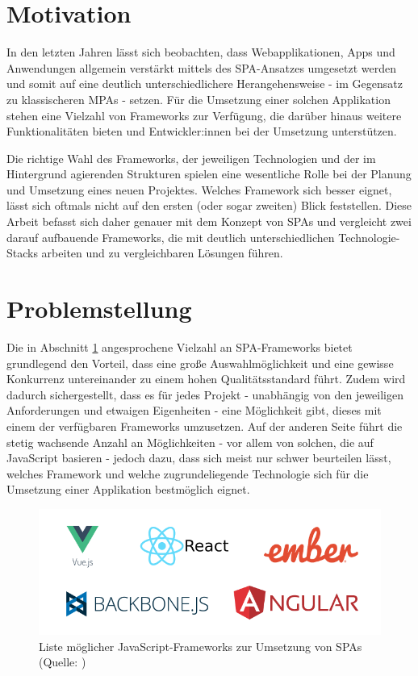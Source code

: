 \documentclass[a4paper,12pt,twoside]{scrreprt}
\begin{document}
\section{Motivation}
\label{sec:motivation}
In den letzten Jahren lässt sich beobachten, dass Webapplikationen, Apps und Anwendungen allgemein verstärkt mittels des \ac{SPA}-Ansatzes umgesetzt werden und somit auf eine deutlich unterschiedlichere Herangehensweise - im Gegensatz zu klassischeren \acp{MPA} - setzen. \parencite[][]{ismail_why_2019} Für die Umsetzung einer solchen Applikation stehen eine Vielzahl von Frameworks zur Verfügung, die darüber hinaus weitere Funktionalitäten bieten und Entwickler:innen bei der Umsetzung unterstützen.

\newpage

Die richtige Wahl des Frameworks, der jeweiligen Technologien und der im Hintergrund agierenden Strukturen spielen eine wesentliche Rolle bei der Planung und Umsetzung eines neuen Projektes. Welches Framework sich besser eignet, lässt sich oftmals nicht auf den ersten (oder sogar zweiten) Blick feststellen. Diese Arbeit befasst sich daher genauer mit dem Konzept von \acp{SPA} und vergleicht zwei darauf aufbauende Frameworks, die mit deutlich unterschiedlichen Technologie-Stacks arbeiten und zu vergleichbaren Lösungen führen.

\section{Problemstellung}
\label{sec:problemstellung}
Die in Abschnitt \ref{sec:motivation} angesprochene Vielzahl an \ac{SPA}-Frameworks bietet grundlegend den Vorteil, dass eine große Auswahlmöglichkeit und eine gewisse Konkurrenz untereinander zu einem hohen Qualitätsstandard führt. Zudem wird dadurch sichergestellt, dass es für jedes Projekt - unabhängig von den jeweiligen Anforderungen und etwaigen Eigenheiten - eine Möglichkeit gibt, dieses mit einem der verfügbaren Frameworks umzusetzen. Auf der anderen Seite führt die stetig wachsende Anzahl an Möglichkeiten - vor allem von solchen, die auf JavaScript basieren - jedoch dazu, dass sich meist nur schwer beurteilen lässt, welches Framework und welche zugrundeliegende Technologie sich für die Umsetzung einer Applikation bestmöglich eignet.

\begin{figure}[ht]
    \centering
    \includegraphics[scale=0.5]{images/A_JS-frameworks.png}
    \caption[Liste möglicher JavaScript-Frameworks zur Umsetzung von \acsp{SPA}]{Liste möglicher JavaScript-Frameworks zur Umsetzung von \acsp{SPA} (Quelle: \cite[][]{a_best_2020})}
    \label{fig:js-frameworks}
\end{figure}
\end{document}

